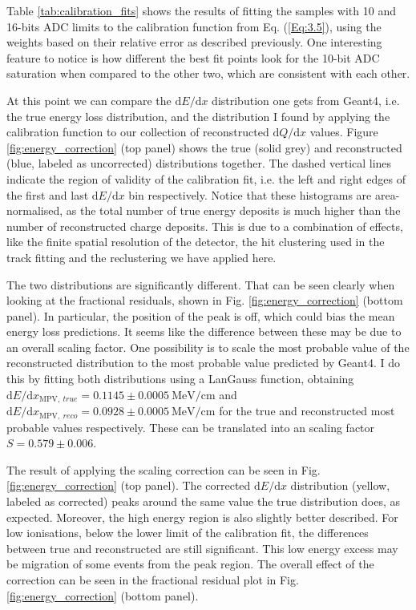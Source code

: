 Table \ref{tab:calibration_fits} shows the results of fitting the samples with 10 and 16-bits ADC limits to the calibration function from Eq. (\ref{Eq:3.5}), using the weights based on their relative error as described previously. One interesting feature to notice is how different the best fit points look for the 10-bit ADC saturation when compared to the other two, which are consistent with each other.

At this point we can compare the $\mathrm{d}E/\mathrm{d}x$ distribution one gets from Geant4, i.e. the true energy loss distribution, and the distribution I found by applying the calibration function to our collection of reconstructed $\mathrm{d}Q/\mathrm{d}x$ values. Figure \ref{fig:energy_correction} (top panel) shows the true (solid grey) and reconstructed (blue, labeled as uncorrected) distributions together. The dashed vertical lines indicate the region of validity of the calibration fit, i.e. the left and right edges of the first and last $\mathrm{d}E/\mathrm{d}x$ bin respectively. Notice that these histograms are area-normalised, as the total number of true energy deposits is much higher than the number of reconstructed charge deposits. This is due to a combination of effects, like the finite spatial resolution of the detector, the hit clustering used in the track fitting and the reclustering we have applied here.

The two distributions are significantly different. That can be seen clearly when looking at the fractional residuals, shown in Fig. \ref{fig:energy_correction} (bottom panel). In particular, the position of the peak is off, which could bias the mean energy loss predictions. It seems like the difference between these may be due to an overall scaling factor. One possibility is to scale the most probable value of the reconstructed distribution to the most probable value predicted by Geant4. I do this by fitting both distributions using a LanGauss function, obtaining $\mathrm{d}E/\mathrm{d}x_{\mathrm{MPV}, ~true} = 0.1145\pm0.0005~\mathrm{MeV}/\mathrm{cm}$ and $\mathrm{d}E/\mathrm{d}x_{\mathrm{MPV}, ~reco} = 0.0928\pm0.0005~\mathrm{MeV}/\mathrm{cm}$ for the true and reconstructed most probable values respectively. These can be translated into an scaling factor $S=0.579\pm0.006$.

The result of applying the scaling correction can be seen in Fig. \ref{fig:energy_correction} (top panel). The corrected $\mathrm{d}E/\mathrm{d}x$ distribution (yellow, labeled as corrected) peaks around the same value the true distribution does, as expected. Moreover, the high energy region is also slightly better described. For low ionisations, below the lower limit of the calibration fit, the differences between true and reconstructed are still significant. This low energy excess may be migration of some events from the peak region. The overall effect of the correction can be seen in the fractional residual plot in Fig. \ref{fig:energy_correction} (bottom panel).

